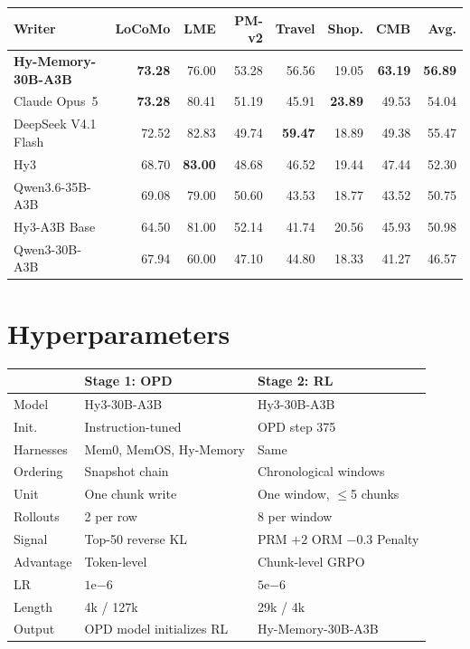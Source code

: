 \documentclass{article}
\renewcommand{\arraystretch}{1.08}
\begin{document}
\begin{minipage}{\linewidth}
\centering
\scriptsize
\setlength{\tabcolsep}{2.4pt}
\begin{tabular}{@{}lrrrrrrr@{}}
\toprule
Writer & LoCoMo & LME & PM-v2 & Travel & Shop. & CMB & Avg. \\
\midrule
\textbf{Hy-Memory-30B-A3B} & \textbf{73.28} & 76.00 & 53.28 & 56.56 & 19.05 & \textbf{63.19} & \textbf{56.89} \\
Claude Opus~5 & \textbf{73.28} & 80.41 & 51.19 & 45.91 & \textbf{23.89} & 49.53 & 54.04 \\
DeepSeek V4.1 Flash & 72.52 & 82.83 & 49.74 & \textbf{59.47} & 18.89 & 49.38 & 55.47 \\
Hy3 & 68.70 & \textbf{83.00} & 48.68 & 46.52 & 19.44 & 47.44 & 52.30 \\
Qwen3.6-35B-A3B & 69.08 & 79.00 & 50.60 & 43.53 & 18.77 & 43.52 & 50.75 \\
Hy3-A3B Base & 64.50 & 81.00 & 52.14 & 41.74 & 20.56 & 45.93 & 50.98 \\
Qwen3-30B-A3B & 67.94 & 60.00 & 47.10 & 44.80 & 18.33 & 41.27 & 46.57 \\
\bottomrule
\end{tabular}
\label{tab:detail-evermemos}
\end{minipage}
\endgroup

\section{Hyperparameters}

\begingroup
\setlength{\abovecaptionskip}{3pt}
\setlength{\belowcaptionskip}{2pt}
\begin{minipage}{\linewidth}
\centering
\small
\renewcommand{\arraystretch}{1.00}
\begin{tabular}{@{}p{1.7cm}p{2.3cm}p{2.4cm}@{}}
\toprule
 & Stage 1: OPD & Stage 2: RL \\
\midrule
Model & Hy3-30B-A3B & Hy3-30B-A3B \\
Init. & Instruction-tuned & OPD step 375 \\
Harnesses & Mem0, MemOS, Hy-Memory & Same \\
Ordering & Snapshot chain & Chronological windows \\
Unit & One chunk write & One window, $\le$5 chunks \\
Rollouts & 2 per row & 8 per window \\
Signal & Top-50 reverse KL & PRM $+2$ ORM $-0.3$ Penalty \\
Advantage & Token-level & Chunk-level GRPO \\
LR & $1\mathrm{e}{-6}$ & $5\mathrm{e}{-6}$ \\
Length & 4k / 127k & 29k / 4k \\
Output & OPD model initializes RL & Hy-Memory-30B-A3B \\
\bottomrule
\end{tabular}
\end{minipage}
\endgroup
\end{document}
